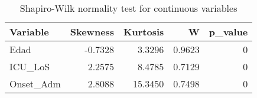 \begin{table}

\caption{Shapiro-Wilk normality test for continuous variables}
\centering
\begin{tabular}[t]{l|r|r|r|r}
\hline
Variable & Skewness & Kurtosis & W & p\_value\\
\hline
Edad & -0.7328 & 3.3296 & 0.9623 & 0\\
\hline
ICU\_LoS & 2.2575 & 8.4785 & 0.7129 & 0\\
\hline
Onset\_Adm & 2.8088 & 15.3450 & 0.7498 & 0\\
\hline
\end{tabular}
\end{table}
